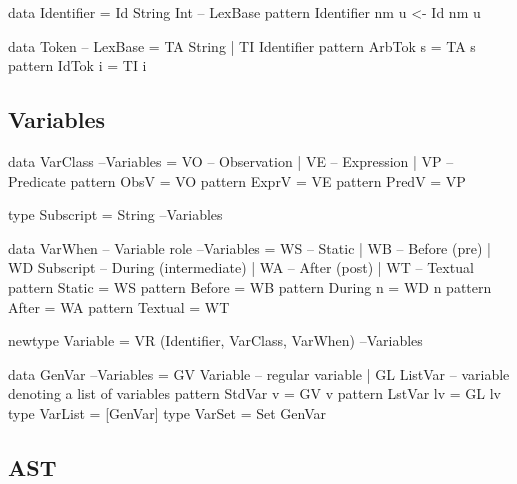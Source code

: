 \begin{code}
data Identifier = Id String Int                                    -- LexBase
pattern Identifier nm u <- Id nm u
\end{code}


\begin{code}
data Token                                                         -- LexBase
 = TA String
 | TI Identifier
pattern ArbTok s = TA s
pattern IdTok i = TI i
\end{code}

\subsection{Variables}

\begin{code}
data VarClass                                                     --Variables
  = VO -- Observation
  | VE -- Expression
  | VP -- Predicate
pattern ObsV  = VO
pattern ExprV = VE
pattern PredV = VP
\end{code}

\begin{code}
type Subscript = String                                           --Variables
\end{code}

\begin{code}
data VarWhen -- Variable role                                     --Variables
  = WS            --  Static
  | WB            --  Before (pre)
  | WD Subscript  --  During (intermediate)
  | WA            --  After (post)
  | WT            --  Textual
pattern Static    =  WS
pattern Before    =  WB
pattern During n  =  WD n
pattern After     =  WA
pattern Textual   =  WT
\end{code}


\begin{code}
newtype Variable  = VR (Identifier, VarClass, VarWhen)            --Variables
\end{code}

\begin{code}
data GenVar                                                        --Variables
 = GV Variable -- regular variable
 | GL ListVar  -- variable denoting a list of variables
pattern StdVar v = GV v
pattern LstVar lv = GL lv
type VarList = [GenVar]
type VarSet = Set GenVar
\end{code}


\subsection{AST}

